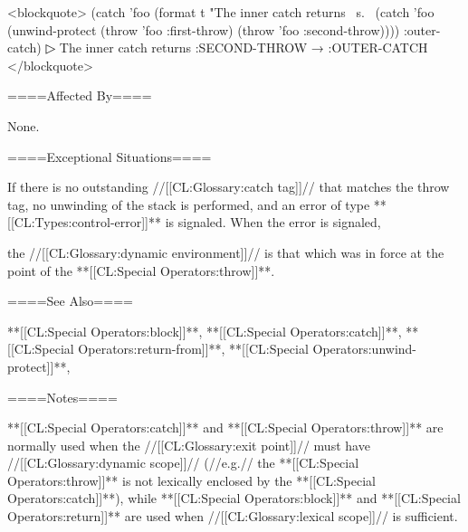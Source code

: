 <blockquote> (catch 'foo (format t "The inner catch returns ~s.~ (catch 'foo (unwind-protect (throw 'foo :first-throw) (throw 'foo :second-throw)))) :outer-catch)
▷ The inner catch returns :SECOND-THROW → :OUTER-CATCH </blockquote>


====Affected By====

None.

====Exceptional Situations====

If there is no outstanding //[[CL:Glossary:catch tag]]// that matches the throw tag, no unwinding of the stack is performed, and an error of type **[[CL:Types:control-error]]** is signaled. When the error is signaled,

the //[[CL:Glossary:dynamic environment]]// is that which was in force at the point of the **[[CL:Special Operators:throw]]**.

====See Also====

**[[CL:Special Operators:block]]**, **[[CL:Special Operators:catch]]**, **[[CL:Special Operators:return-from]]**, **[[CL:Special Operators:unwind-protect]]**, {\secref\Evaluation}

====Notes====

**[[CL:Special Operators:catch]]** and **[[CL:Special Operators:throw]]** are normally used when the //[[CL:Glossary:exit point]]// must have //[[CL:Glossary:dynamic scope]]// (//e.g.// the **[[CL:Special Operators:throw]]** is not lexically enclosed by the **[[CL:Special Operators:catch]]**), while **[[CL:Special Operators:block]]** and **[[CL:Special Operators:return]]** are used when //[[CL:Glossary:lexical scope]]// is sufficient.

